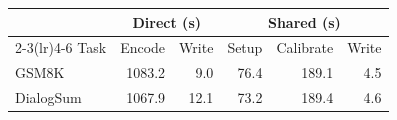 \begin{tabular}{@{}lrrrrr@{}}
\toprule
 & \multicolumn{2}{c}{Direct (s)} & \multicolumn{3}{c}{Shared (s)} \\
\cmidrule(lr){2-3}\cmidrule(lr){4-6}
Task & Encode & Write & Setup & Calibrate & Write \\
\midrule
GSM8K & 1083.2 & 9.0 & 76.4 & 189.1 & 4.5 \\
DialogSum & 1067.9 & 12.1 & 73.2 & 189.4 & 4.6 \\
\bottomrule
\end{tabular}
